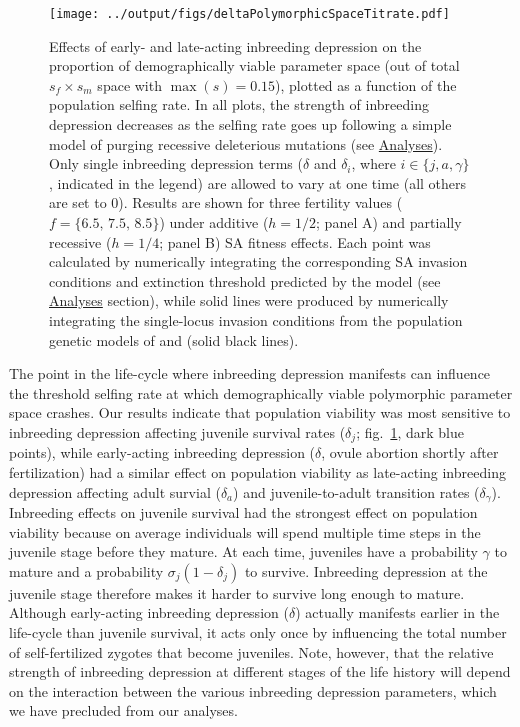\documentclass[11pt]{article}
\begin{document}
 \begin{figure}[htbp]
 \centering
 \texttt{[image: ../output/figs/deltaPolymorphicSpaceTitrate.pdf]}
 \caption{\footnotesize{Effects of early- and late-acting inbreeding depression on the proportion of demographically viable parameter space (out of total $s_f \times s_m$ space with $\max(s) = 0.15$), plotted as a function of the population selfing rate. In all plots, the strength of inbreeding depression decreases as the selfing rate goes up following a simple model of purging recessive deleterious mutations (see \hyperref[subsec:analyses]{Analyses}). Only single inbreeding depression terms ($\delta$ and $\delta_i$, where $i \in \{j,a,\gamma\}$, indicated in the legend) are allowed to vary at one time (all others are set to $0$). Results are shown for three fertility values ($f = \{6.5,\,7.5,\,8.5\}$) under additive ($h = 1/2$; panel A) and partially recessive ($h = 1/4$; panel B) SA fitness effects. Each point was calculated by numerically integrating the corresponding SA invasion conditions and extinction threshold predicted by the model (see \hyperref[subsec:analyses]{Analyses} section), while solid lines were produced by numerically integrating the single-locus invasion conditions from the population genetic models of \citet{JordanConnallon2014} and \citet{Olito2017} (solid black lines).}} 
 \label{fig:deltaPolySpace}
 \end{figure}


The point in the life-cycle where inbreeding depression manifests can influence the threshold selfing rate at which demographically viable polymorphic parameter space crashes. Our results indicate that population viability was most sensitive to inbreeding depression affecting juvenile survival rates ($\delta_j$; fig.~\ref{fig:deltaPolySpace}, dark blue points), while early-acting inbreeding depression ($\delta$, ovule abortion shortly after fertilization) had a similar effect on population viability as late-acting inbreeding depression affecting adult survial ($\delta_a$) and juvenile-to-adult transition rates ($\delta_{\gamma}$). Inbreeding effects on juvenile survival had the strongest effect on population viability because on average individuals will spend multiple time steps in the juvenile stage before they mature. At each time, juveniles have a probability $\gamma$ to mature and a probability $\sigma_j(1-\delta_j)$ to survive. Inbreeding depression at the juvenile stage therefore makes it harder to survive long enough to mature. Although early-acting inbreeding depression ($\delta$) actually manifests earlier in the life-cycle than juvenile survival, it acts only once by influencing the total number of self-fertilized zygotes that become juveniles. Note, however, that the relative strength of inbreeding depression at different stages of the life history will depend on the interaction between the various inbreeding depression parameters, which we have precluded from our analyses.
\end{document}
